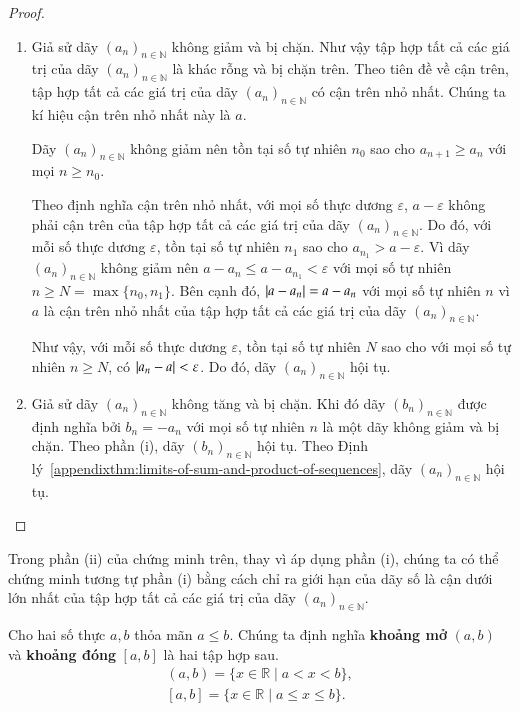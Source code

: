 \begin{proof}
    \begin{enumerate}[label={(\roman*)}]
        \item Giả sử dãy ${(a_{n})}_{n\in\mathbb{N}}$ không giảm và bị chặn. Như vậy tập hợp tất cả các giá trị của dãy ${(a_{n})}_{n\in\mathbb{N}}$ là khác rỗng và bị chặn trên. Theo tiên đề về cận trên, tập hợp tất cả các giá trị của dãy ${(a_{n})}_{n\in\mathbb{N}}$ có cận trên nhỏ nhất. Chúng ta kí hiệu cận trên nhỏ nhất này là $a$.

              Dãy ${(a_{n})}_{n\in\mathbb{N}}$ không giảm nên tồn tại số tự nhiên $n_{0}$ sao cho $a_{n+1}\geq a_{n}$ với mọi $n\geq n_{0}$.

              Theo định nghĩa cận trên nhỏ nhất, với mọi số thực dương $\varepsilon$, $a - \varepsilon$ không phải cận trên của tập hợp tất cả các giá trị của dãy ${(a_{n})}_{n\in\mathbb{N}}$. Do đó, với mỗi số thực dương $\varepsilon$, tồn tại số tự nhiên $n_{1}$ sao cho $a_{n_{1}} > a - \varepsilon$. Vì dãy ${(a_{n})}_{n\in\mathbb{N}}$ không giảm nên $a - a_{n}\leq a - a_{n_{1}} < \varepsilon$ với mọi số tự nhiên $n\geq N = \max\{ n_{0}, n_{1} \}$. Bên cạnh đó, $\left\vert{a - a_{n}}\right\vert = a - a_{n}$ với mọi số tự nhiên $n$ vì $a$ là cận trên nhỏ nhất của tập hợp tất cả các giá trị của dãy ${(a_{n})}_{n\in\mathbb{N}}$.

              Như vậy, với mỗi số thực dương $\varepsilon$, tồn tại số tự nhiên $N$ sao cho với mọi số tự nhiên $n\geq N$, có $\left\vert{a_{n} - a}\right\vert < \varepsilon$. Do đó, dãy ${(a_{n})}_{n\in\mathbb{N}}$ hội tụ.
        \item Giả sử dãy ${(a_{n})}_{n\in\mathbb{N}}$ không tăng và bị chặn. Khi đó dãy $(b_{n})_{n\in\mathbb{N}}$ được định nghĩa bởi $b_{n} = -a_{n}$ với mọi số tự nhiên $n$ là một dãy không giảm và bị chặn. Theo phần (i), dãy $(b_{n})_{n\in\mathbb{N}}$ hội tụ. Theo Định lý~\ref{appendixthm:limits-of-sum-and-product-of-sequences}, dãy ${(a_{n})}_{n\in\mathbb{N}}$ hội tụ.
    \end{enumerate}
\end{proof}

Trong phần (ii) của chứng minh trên, thay vì áp dụng phần (i), chúng ta có thể chứng minh tương tự phần (i) bằng cách chỉ ra giới hạn của dãy số là cận dưới lớn nhất của tập hợp tất cả các giá trị của dãy ${(a_{n})}_{n\in\mathbb{N}}$.

\begin{definition}
    Cho hai số thực $a, b$ thỏa mãn $a\leq b$. Chúng ta định nghĩa \textbf{khoảng mở} $(a, b)$ và \textbf{khoảng đóng} $[a, b]$ là hai tập hợp sau.
    \[
        \begin{split}
            (a, b) = \{ x\in\mathbb{R} \mid a < x < b \}, \\
            [a, b] = \{ x\in\mathbb{R} \mid a\leq x\leq b \}.
        \end{split}
    \]
\end{definition}

